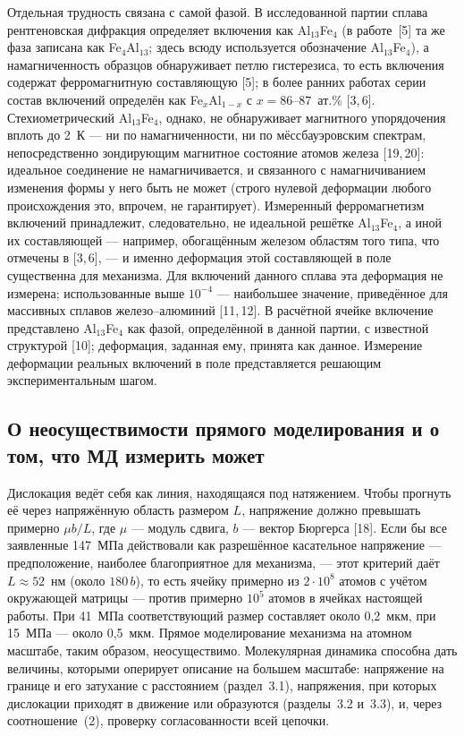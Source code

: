Отдельная трудность связана с самой фазой. В исследованной партии сплава
рентгеновская дифракция определяет включения как Al$_{13}$Fe$_4$ (в
работе~[5] та же фаза записана как Fe$_4$Al$_{13}$; здесь всюду используется
обозначение Al$_{13}$Fe$_4$), а намагниченность образцов обнаруживает петлю
гистерезиса, то есть включения содержат ферромагнитную составляющую [5]; в
более ранних работах серии состав включений определён как Fe$_x$Al$_{1-x}$ с
$x = 86$--$87$~ат.\% [3,\,6]. Стехиометрический Al$_{13}$Fe$_4$, однако, не
обнаруживает магнитного упорядочения вплоть до 2~К --- ни по намагниченности,
ни по мёссбауэровским спектрам, непосредственно зондирующим магнитное
состояние атомов железа [19,\,20]: идеальное соединение не намагничивается,
и связанного с намагничиванием изменения формы у него быть не может (строго
нулевой деформации любого происхождения это, впрочем, не гарантирует).
Измеренный ферромагнетизм включений принадлежит, следовательно, не идеальной
решётке Al$_{13}$Fe$_4$, а иной их составляющей --- например, обогащённым
железом областям того типа, что отмечены в [3,\,6], --- и именно деформация
этой составляющей в поле существенна для механизма. Для включений данного
сплава эта деформация не измерена; использованные выше $10^{-4}$ ---
наибольшее значение, приведённое для массивных сплавов железо--алюминий
[11,\,12]. В расчётной ячейке включение представлено Al$_{13}$Fe$_4$ как
фазой, определённой в данной партии, с известной структурой [10];
деформация, заданная ему, принята как данное. Измерение деформации реальных
включений в поле представляется решающим экспериментальным шагом.

\subsection{О неосуществимости прямого моделирования и о том,
что МД измерить может}

Дислокация ведёт себя как линия, находящаяся под натяжением. Чтобы прогнуть
её через напряжённую область размером $L$, напряжение должно превышать
примерно $\mu b/L$, где $\mu$ --- модуль сдвига, $b$ --- вектор Бюргерса
[18]. Если бы все заявленные 147~МПа действовали как разрешённое касательное
напряжение --- предположение, наиболее благоприятное для механизма, --- этот
критерий даёт $L \approx 52$~нм (около $180\,b$), то есть ячейку примерно из
$2\cdot10^{8}$ атомов с учётом окружающей матрицы --- против примерно
$10^{5}$ атомов в ячейках настоящей работы. При 41~МПа соответствующий
размер составляет около 0{,}2~мкм, при 15~МПа --- около 0{,}5~мкм.
Прямое моделирование механизма на атомном масштабе, таким образом,
неосуществимо. Молекулярная динамика способна дать величины, которыми
оперирует описание на большем масштабе: напряжение на границе и его затухание
с расстоянием (раздел~3.1), напряжения, при которых дислокации приходят в
движение или образуются (разделы~3.2 и~3.3), и, через соотношение~(2),
проверку согласованности всей цепочки.

